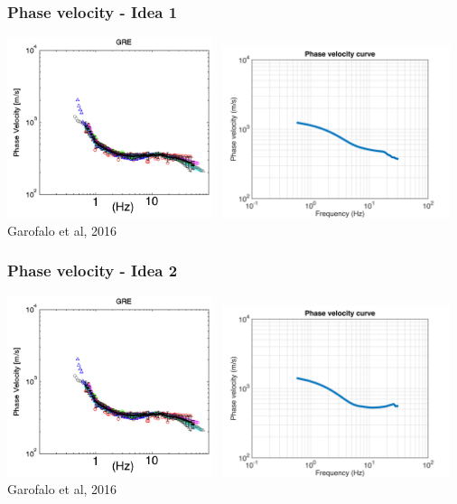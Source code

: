 \documentclass{beamer}
\begin{document}
%                                                                                              
\frame
{
\frametitle{{\bf Phase velocity - Idea 1}}
\centering
\includegraphics[width=0.45\textwidth]{../pics/phase-vel.png}~
\includegraphics[width=0.5\textwidth]{../pics/phase-vel-onyva.png}
\vfill
\flushleft
Garofalo et al, 2016
}
%                                                                                              
\frame
{
\frametitle{{\bf Phase velocity - Idea 2}}
\centering
\includegraphics[width=0.45\textwidth]{../pics/phase-vel.png}~
\includegraphics[width=0.5\textwidth]{../pics/phase-vel-vamos.png}
\vfill
\flushleft
Garofalo et al, 2016
}
\end{document}
